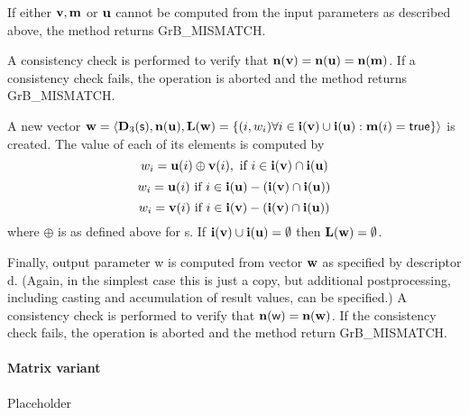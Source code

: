 If either ${\bf v}, {\bf m}$ or ${\bf u}$ cannot be computed
from the input parameters as described above, the method returns {\sf
GrB\_MISMATCH}.

A consistency check is performed to verify that $\bold{n}({\bf v})
= \bold{n}({\bf u}) = \bold{n}({\bf m})$. If a consistency check fails, the operation is
aborted and the method returns {\sf GrB\_MISMATCH}.

A new vector ${\bf w} = \langle \bold{D}_3({\sf s}),
\bold{n}({\bf u}), \bold{L}({\bf w}) = \{(i,w_i)  \forall i \in
{\bf i}({\bf v}) \cup {\bf i}({\bf u}) : {\bf m}(i)
= {\sf true} \} \rangle$ is created.  The value of each of its
elements is computed by 
\[
w_i = {\bf u}(i) \oplus {\bf v}(i), \ \mbox{if}\  i \in  {\bf i}({\bf v}) \cap {\bf i}({\bf u})
\]
\[
w_i = {\bf u}(i) \ \mbox{if}\  i \in  {\bf i}({\bf u}) - ({\bf i}({\bf v}) \cap {\bf i}({\bf u}))
\]
\[
w_i = {\bf v}(i) \ \mbox{if}\  i \in  {\bf i}({\bf v}) - ({\bf i}({\bf v}) \cap {\bf i}({\bf u}))
\]
where $\oplus$ is as defined above for {\sf s}.
If ${\bf i}({\bf v}) \cup {\bf i}({\bf u}) = \emptyset$
then $\bold{L}({\bf w}) = \emptyset$.

Finally, output parameter {\sf w} is computed from vector ${\bf w}$
as specified by descriptor {\sf d}. (Again, in the simplest case this
is just a copy, but additional postprocessing, including casting and
accumulation of result values, can be specified.)  A consistency check is
performed to verify that $\bold{n}({\sf w}) = \bold{n}({\bf w})$. If
the consistency check fails, the operation is aborted and the method
return {\sf GrB\_MISMATCH}.



\paragraph{Matrix variant}

Placeholder

